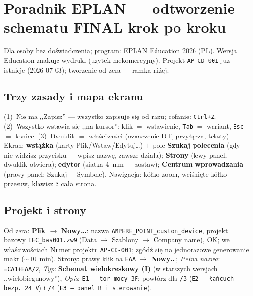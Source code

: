 \documentclass[11pt,a4paper]{article}
\begin{document}
\section{Poradnik EPLAN --- odtworzenie schematu FINAL krok po kroku}
Dla osoby bez doświadczenia; program: EPLAN Education 2026 (PL). Wersja Education znakuje wydruki
(użytek niekomercyjny). Projekt \texttt{AP-CD-001} już istnieje (2026-07-03); tworzenie od zera
--- ramka niżej.

\subsection{Trzy zasady i mapa ekranu}
(1)~Nie ma ,,Zapisz'' --- wszystko zapisuje się od razu; cofanie: \texttt{Ctrl+Z}. (2)~Wszystko
wstawia się ,,na kursor'': klik $=$ wstawienie, \texttt{Tab} $=$ wariant, \texttt{Esc} $=$ koniec.
(3)~Dwuklik $=$ właściwości (oznaczenie DT, przyłącza, teksty). Ekran: \textbf{wstążka} (karty
Plik/Wstaw/Edytuj\ldots) $+$ pole \textbf{Szukaj polecenia} (gdy nie widzisz przycisku --- wpisz
nazwę, zawsze działa); \textbf{Strony} (lewy panel, dwuklik otwiera); \textbf{edytor} (siatka
4~mm --- zostaw); \textbf{Centrum wprowadzania} (prawy panel: Szukaj $+$ Symbole). Nawigacja:
kółko zoom, wciśnięte kółko przesuw, klawisz \texttt{3} cała strona.

\subsection{Projekt i strony}
Od zera: \textbf{Plik $\to$ Nowy\ldots}: nazwa \texttt{AMPERE\_POINT\_custom\_device}, projekt
bazowy \texttt{IEC\_bas001.zw9} (Data $\to$ Szablony $\to$ Company name), OK; we właściwościach
Numer projektu \texttt{AP-CD-001}; zgódź się na jednorazowe generowanie makr ($\sim$10~min).
Strony: prawy klik na \texttt{EAA} $\to$ \textbf{Nowy\ldots}; \emph{Pełna nazwa}: \texttt{=CA1+EAA/2},
\emph{Typ}: \textbf{Schemat wielokreskowy (I)} (w starszych wersjach ,,wielobiegunowy''),
\emph{Opis}: \texttt{E1 --- tor mocy 3F}; powtórz dla \texttt{/3} (\texttt{E2 --- łańcuch bezp.
24 V}) i \texttt{/4} (\texttt{E3 --- panel B i sterowanie}).
\end{document}
